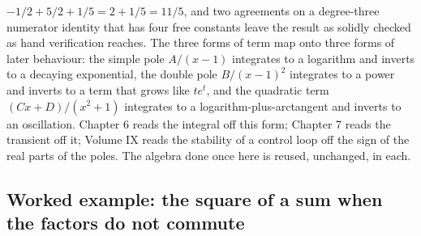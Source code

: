 $-1/2 + 5/2 + 1/5 = 2 + 1/5 = 11/5$, and two agreements on a
degree-three numerator identity that has four free constants leave the
result as solidly checked as hand verification reaches. The three
forms of term map onto three forms of later behaviour: the simple pole
$A/(x - 1)$ integrates to a logarithm and inverts to a decaying
exponential, the double pole $B/(x - 1)^{2}$ integrates to a power and
inverts to a term that grows like $t e^{t}$, and the quadratic term
$(Cx + D)/(x^{2} + 1)$ integrates to a logarithm-plus-arctangent and
inverts to an oscillation. Chapter 6 reads the integral off this form;
Chapter 7 reads the transient off it; Volume IX reads the stability of
a control loop off the sign of the real parts of the poles. The
algebra done once here is reused, unchanged, in each.

\subsection{Worked example: the square of a sum when the factors do
not commute}

